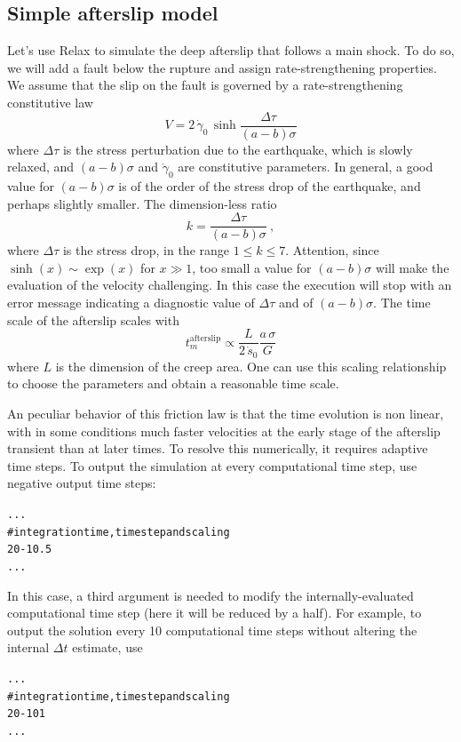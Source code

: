 \documentclass[10pt]{article}
\begin{document}
\subsection{Simple afterslip model}

Let's use Relax to simulate the deep afterslip that follows a main shock. To do so, we will add a fault below the rupture and assign rate-strengthening properties. We assume that the slip on the fault is governed by a rate-strengthening constitutive law
\begin{equation}
V=2\,\dot{\gamma}_0\,\sinh\frac{\Delta\tau}{(a-b)\sigma}
\end{equation}
where $\Delta\tau$ is the stress perturbation due to the earthquake, which is slowly relaxed, and $(a-b)\sigma$ and $\dot{\gamma}_0$ are constitutive parameters. In general, a good value for $(a-b)\sigma$ is of the order of the stress drop of the earthquake, and perhaps slightly smaller. The dimension-less ratio
\begin{equation}
k=\frac{\Delta\tau}{(a-b)\sigma}~,
\end{equation}
where $\Delta\tau$ is the stress drop, in the range $1\le k\le 7$. Attention, since $\sinh(x)\sim\exp(x)$ for $x\gg1$, too small a value for $(a-b)\sigma$ will make the evaluation of the velocity challenging. In this case the execution will stop with an error message indicating a diagnostic value of $\Delta\tau$ and of $(a-b)\sigma$. The time scale of the afterslip scales with
\begin{equation}
t_m^{\text{afterslip}}\propto\frac{L}{2\,\dot{s}_0}\frac{a\,\sigma}{G}
\end{equation}
where $L$ is the dimension of the creep area. One can use this scaling relationship to choose the parameters and obtain a reasonable time scale. 

An peculiar behavior of this friction law is that the time evolution is non linear, with in some conditions much faster velocities at the early stage of the afterslip transient than at later times. To resolve this numerically, it requires adaptive time steps. To output the simulation at every computational time step, use negative output time steps:
\begin{alltt}
...
# integration time, time step and scaling
{\color{NavyBlue}20 -1 0.5}
...
\end{alltt}
In this case, a third argument is needed to modify the internally-evaluated computational time step (here it will be reduced by a half). For example, to output the solution every 10 computational time steps without altering the internal $\Delta t$ estimate, use
\begin{alltt}
...
# integration time, time step and scaling
{\color{NavyBlue}20 -10 1}
...
\end{alltt}
\end{document}
